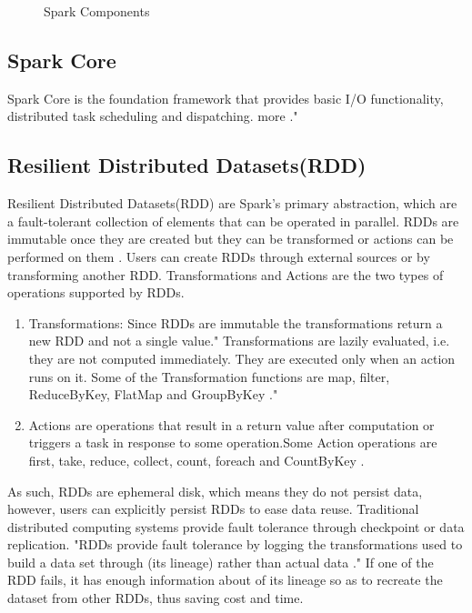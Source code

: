 \documentclass[9pt,twocolumn,twoside]{../../styles/osajnl}
\begin{document}
\begin{figure}[htbp]
\centering
{}
\caption{Spark Components \cite{book-spark}}
\label{fig:spark-stack}
\end{figure}

\subsection{Spark Core}

Spark Core is the foundation framework that provides basic I/O functionality, distributed task scheduling and dispatching.
more \cite{article-spark-1}." 
\subsection{Resilient Distributed Datasets(RDD)}
Resilient Distributed Datasets(RDD) \cite{paper-RDD} are Spark's
primary abstraction, which are a fault-tolerant collection of elements that can be operated in parallel. RDDs are immutable once they are created but they can be transformed or actions can be performed on them \cite{article-spark-1}. Users can create RDDs through external sources or by transforming another RDD. Transformations and Actions are the two
types of operations supported by RDDs.
\begin{enumerate}
\item Transformations: Since RDDs are immutable the transformations return a new RDD and not a single value." Transformations are lazily evaluated, i.e. they are not computed immediately. They are executed
only when an action runs on it. Some of the Transformation functions are map, filter, ReduceByKey, FlatMap and GroupByKey \cite{article-spark-1}."
\item Actions are operations that result in a return
value after computation or triggers a task in response to some
operation.Some Action operations are first, take, reduce,
collect, count, foreach and CountByKey \cite{article-spark-1}.
\end{enumerate}
As such, RDDs are ephemeral disk, which means they do not persist
data, however, users can explicitly persist RDDs to ease data
reuse. Traditional distributed computing systems provide fault
tolerance through checkpoint or data replication. "RDDs provide fault
tolerance by logging the transformations used to build a data set
through (its lineage) rather than actual data \cite{paper-RDD}." If one of the RDD fails, it has enough information about of its lineage so as to recreate the dataset from other RDDs, thus saving cost and time.
\end{document}
